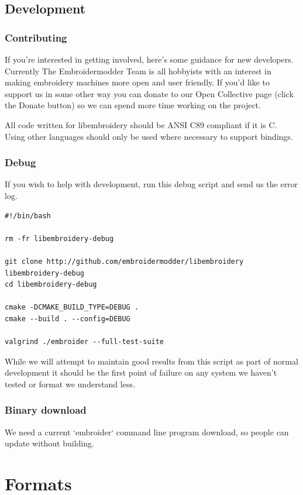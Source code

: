 \documentclass{report}
\begin{document}
\section{Development}

\subsection{Contributing}

If you're interested in getting involved, here's some guidance
for new developers. Currently The Embroidermodder Team is all
hobbyists with an interest in making embroidery machines more
open and user friendly. If you'd like to support us in some other way
you can donate to our Open Collective page (click the Donate button) so
we can spend more time working on the project.

All code written for libembroidery should be ANSI C89 compliant
if it is C. Using other languages should only be used where
necessary to support bindings.

\subsection{Debug}

If you wish to help with development, run this debug script and send us the error log.

\begin{lstlisting}
#!/bin/bash

rm -fr libembroidery-debug

git clone http://github.com/embroidermodder/libembroidery libembroidery-debug
cd libembroidery-debug

cmake -DCMAKE_BUILD_TYPE=DEBUG .
cmake --build . --config=DEBUG

valgrind ./embroider --full-test-suite
\end{lstlisting}

While we will attempt to maintain good results from this script as part of normal development it should be the first point of failure on any system we haven't tested or format we understand less.

\subsection{Binary download}

We need a current `embroider` command line program download, so people can update
without building.

\chapter{Formats}
\end{document}

